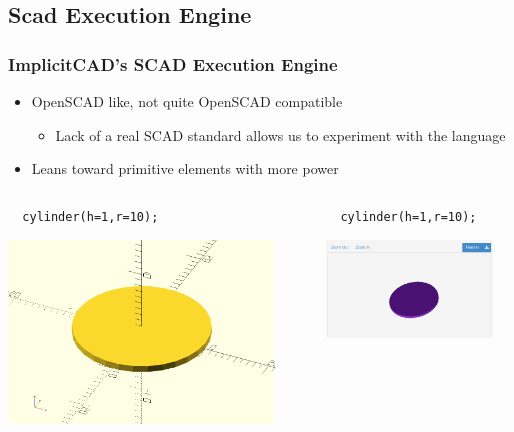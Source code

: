 \documentclass{beamer}
\begin{document}
\subsection{Scad Execution Engine}
\begin{frame}[fragile]
\frametitle{ImplicitCAD's SCAD Execution Engine}
\begin{itemize}
\item OpenSCAD like, not quite OpenSCAD compatible
\begin{itemize}
\item Lack of a real SCAD standard allows us to experiment with the language
\end{itemize}
\item Leans toward primitive elements with more power
\end{itemize}
\begin{columns}
  \begin{column}{0.5\textwidth}
  \lstset{basicstyle=\ttfamily\scriptsize}
\begin{lstlisting}
  cylinder(h=1,r=10);
\end{lstlisting}
    \includegraphics[width=0.9\textwidth, left]{openscad-cylinder.png}
  \end{column}
  \begin{column}{0.5\textwidth}
  \lstset{basicstyle=\ttfamily\scriptsize}
\begin{lstlisting}
  cylinder(h=1,r=10);
\end{lstlisting}
    \includegraphics[width=0.9\textwidth, right]{implicitcad-cylinder.png}
  \end{column}
\end{columns}
\end{frame}
\end{document}
